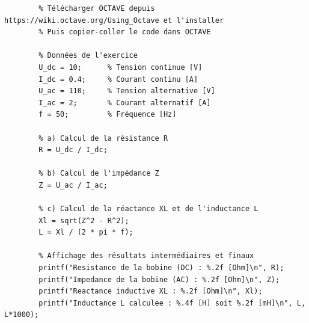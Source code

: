 \documentclass[a4paper,11pt,answers,addpoints]{exam}
\begin{document}
\begin{questions}
\begin{solution}
	\begin{verbatim}
		% Télécharger OCTAVE depuis https://wiki.octave.org/Using_Octave et l'installer
		% Puis copier-coller le code dans OCTAVE
		
		% Données de l'exercice
		U_dc = 10;      % Tension continue [V]
		I_dc = 0.4;     % Courant continu [A]
		U_ac = 110;     % Tension alternative [V]
		I_ac = 2;       % Courant alternatif [A]
		f = 50;         % Fréquence [Hz]
		
		% a) Calcul de la résistance R
		R = U_dc / I_dc;
		
		% b) Calcul de l'impédance Z
		Z = U_ac / I_ac;
		
		% c) Calcul de la réactance XL et de l'inductance L
		Xl = sqrt(Z^2 - R^2);
		L = Xl / (2 * pi * f);
		
		% Affichage des résultats intermédiaires et finaux
		printf("Resistance de la bobine (DC) : %.2f [Ohm]\n", R);
		printf("Impedance de la bobine (AC) : %.2f [Ohm]\n", Z);
		printf("Reactance inductive XL : %.2f [Ohm]\n", Xl);
		printf("Inductance L calculee : %.4f [H] soit %.2f [mH]\n", L, L*1000);
	\end{verbatim}
\end{solution}

	
\end{questions}
\end{document}
